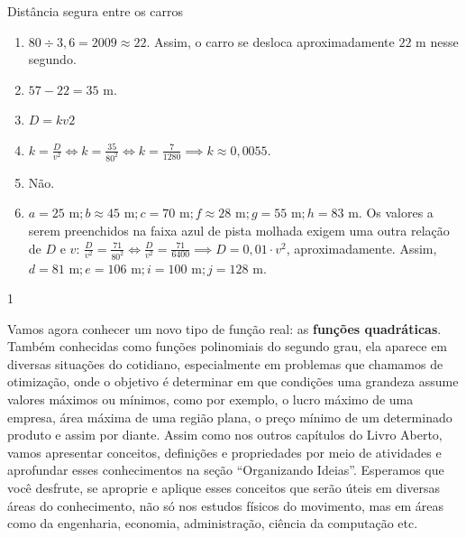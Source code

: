 \begin{answer}{Distância segura entre os carros}
{
\begin{enumerate}
\item $80\div3{,}6=2009\approx22$. Assim, o carro se desloca aproximadamente $22$ m nesse segundo.
\item $57−22=35$ m.
\item $D=kv2$
\item $k=\frac{D}{v^2}\iff k=\frac{35}{80^2}\iff k=\frac{7}{1280}\implies k\approx0{,}0055$.
\item Não.
\item $a=25\text{ m}; b\approx45 \text{ m}; c=70 \text{ m}; f\approx28 \text{ m}; g=55 \text{ m}; h=83 \text{ m}.$ Os valores a serem preenchidos na faixa azul de pista molhada exigem uma outra relação de $D$ e $v$: $\frac{D}{v^2}=\frac{71}{80^2}\iff\frac{D}{v^2}=\frac{71}{6400}\implies D=0{,}01\cdot v^2$, aproximadamente. Assim, $d=81 \text{ m}; e=106 \text{ m}; i=100 \text{ m}; j=128 \text{ m}$.
\end{enumerate}
}{1}
\end{answer}

\label{\detokenize{AF209-0:sec-funcao-quadratica-movimento-com-velocidade-variavel-queda-vertical}}\label{\detokenize{AF209-0::doc}}\label{\detokenize{AF209-0:explorando-movimentos-com-velocidade-variavel}}\label{\detokenize{AF209-0:ativ-funcao-quadratica-lancamento-vertical-em-dubai}}

Vamos agora conhecer um {}novo tipo de função real: as \textbf{funções quadráticas}. Também conhecidas como funções polinomiais do segundo grau, ela aparece em diversas situações do cotidiano, especialmente em problemas que chamamos de otimização, onde o objetivo é determinar em que condições uma grandeza assume valores máximos ou mínimos, como por exemplo, o lucro máximo de uma empresa, área máxima de uma região plana, o preço mínimo de um determinado produto e assim por diante. Assim como nos outros capítulos do Livro Aberto, vamos apresentar conceitos, definições e propriedades por meio de atividades e aprofundar esses conhecimentos na seção “Organizando Ideias”. Esperamos que você desfrute, se aproprie e aplique esses conceitos que serão úteis em diversas áreas do conhecimento, não só nos estudos físicos do movimento, mas em áreas como da engenharia, economia, administração, ciência da computação etc.

